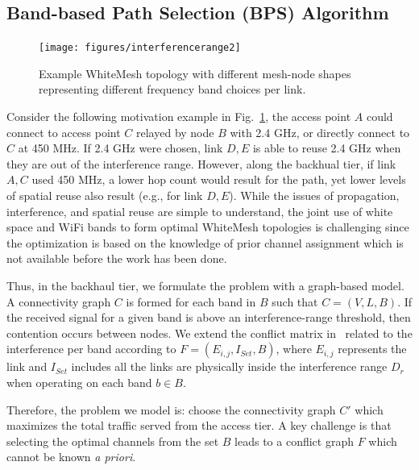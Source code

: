 \subsection{Band-based Path Selection (BPS) Algorithm}
\label{subsec:BPS}

\begin{figure}
\vspace{-0.0in}
\centering
\texttt{[image: figures/interferencerange2]}
\vspace{-0.1in}
\caption{Example WhiteMesh topology with different mesh-node shapes 
representing different frequency band choices per link.}
\label{fig:interferencerange}
\vspace{-0.1in}
\end{figure}

Consider the following motivation example in Fig.~\ref{fig:interferencerange}, the access point $A$ could connect to access point $C$ 
relayed by node $B$ with 2.4 GHz, or directly connect to $C$ at 450 MHz. If 2.4 GHz were 
chosen, link $D,E$ is able to reuse 2.4 GHz when they are out of the interference range. 
However, along the backhual tier, if link $A,C$ used 450 MHz, a lower hop count would 
result for the path, yet lower levels of spatial reuse also result (e.g., for link $D,E$). 
While the issues of propagation, interference, and spatial reuse are simple to understand, 
the joint use of white space and WiFi bands to form optimal WhiteMesh topologies is 
challenging since the optimization is based on the knowledge of prior channel assignment 
which is not available before the work has been done.

Thus, in the backhaul tier, we formulate the problem with a graph-based model. A connectivity graph $C$ is 
formed for each band in $B$ such that $C=(V,L,B)$. If the received signal for a given band is 
above an interference-range threshold, then contention occurs between nodes. We extend the conflict 
matrix in~\cite{tang2005interference} related to the interference per band according to 
$F=(E_{i,j},I_{Set},B)$, where $E_{i,j}$ represents the link and $I_{Set}$ includes all the links 
are physically inside the interference range $D_r$ when operating on each band $b \in B$.

Therefore, the problem we model is: choose the connectivity graph $C'$ which maximizes the total traffic served 
from the access tier. A key challenge is that selecting the optimal channels from the 
set $B$ leads to a conflict graph $F$ which cannot be known {\it a priori}. 

